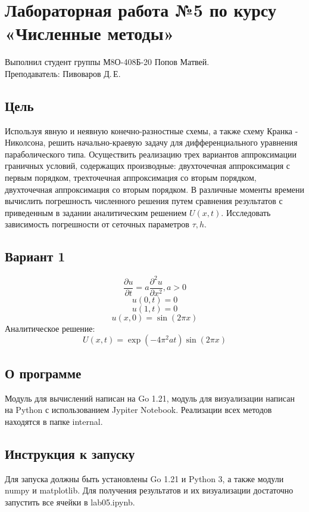 \documentclass{article}
\begin{document}
\section*{Лабораторная работа №5 по курсу «Численные методы»}

Выполнил студент группы М8О-408Б-20 Попов Матвей.
\\
Преподаватель: Пивоваров Д.\,Е.

\subsection*{Цель}

Используя явную и неявную конечно-разностные схемы, а также схему 
Кранка - Николсона, решить начально-краевую задачу для дифференциального 
уравнения параболического типа. Осуществить реализацию трех вариантов 
аппроксимации граничных условий, содержащих производные: двухточечная 
аппроксимация с первым порядком, трехточечная аппроксимация со вторым порядком, 
двухточечная аппроксимация со вторым порядком. В различные моменты времени 
вычислить погрешность численного решения путем сравнения результатов с 
приведенным в задании аналитическим решением $ U(x, t) $. Исследовать 
зависимость погрешности от сеточных параметров $ \tau, h $.

\subsection*{Вариант 1}
$$ \frac{\partial u}{\partial t}=a \frac{\partial^2u}{\partial x^2}, a > 0 $$
$$ u(0, t) = 0 $$
$$ u(1, t) = 0 $$
$$ u(x, 0) = \sin{(2\pi x)} $$
Аналитическое решение: $$ U(x, t) = \exp{(-4\pi^2 at)}\sin{(2\pi x)} $$

\subsection*{О программе}
Модуль для вычислений написан на Go 1.21, модуль для визуализации написан 
на Python с использованием Jypiter Notebook. Реализации всех методов находятся 
в папке internal.

\subsection*{Инструкция к запуску}
Для запуска должны быть установлены Go 1.21 и Python 3, а также модули numpy и 
matplotlib. Для получения результатов и их визуализации достаточно запустить 
все ячейки в lab05.ipynb.
\end{document}

